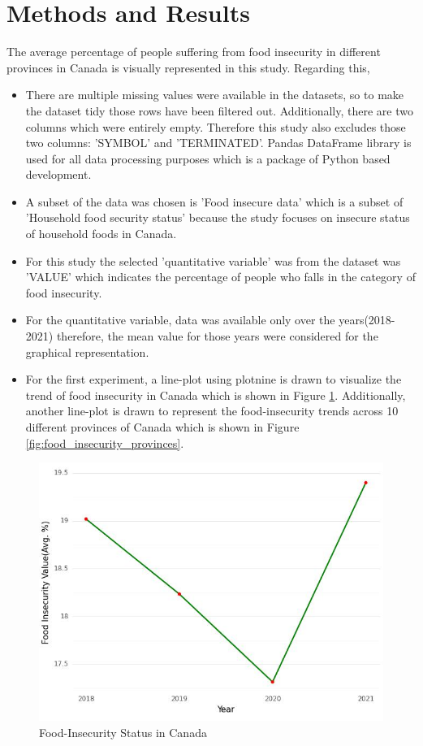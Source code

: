 \documentclass[11pt]{article}
\begin{document}
\section{Methods and Results}
The average percentage of people suffering from food insecurity in different provinces in Canada is visually represented in this study.  Regarding this, 
\begin{itemize}
    \item There are multiple missing values were available in the datasets, so to make the dataset tidy those rows have been filtered out. Additionally, there are two columns which were entirely empty. Therefore this study also excludes those two columns: 'SYMBOL' and 'TERMINATED'. Pandas DataFrame \cite{pandasdf} library is used for all data processing purposes which is a package of Python based development.  
    \item A subset of the data was chosen is 'Food insecure data' which is a subset of 'Household food security status' because the study focuses on insecure status of household foods in Canada.  
    \item For this study the selected 'quantitative variable' was from the dataset was 'VALUE' which indicates the percentage of people who falls in the category of food insecurity. 
    \item For the quantitative variable, data was available only over the years(2018-2021) therefore, the mean value for those years were considered for the graphical representation. 
    \item For the first experiment, a line-plot using plotnine \cite{plotnine} is drawn to visualize the trend of food insecurity in Canada which is shown in Figure \ref{fig:food_insecurity_canada}. Additionally, another line-plot is drawn to represent the food-insecurity trends across 10 different provinces of Canada which is shown in Figure \ref{fig:food_insecurity_provinces}.
\end{itemize}

\begin{figure}
\centering
\includegraphics[width=0.75\linewidth]{images/food_insecurity_canada.jpeg}
\caption{\label{fig:food_insecurity_canada} Food-Insecurity Status in Canada}
\end{figure}
\end{document}

